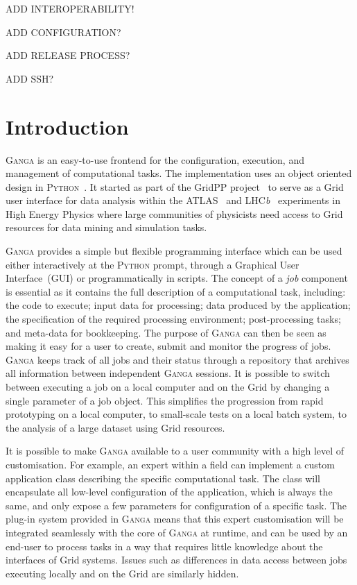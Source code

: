 \documentclass{elsart}
\def\lhcb {LHC{\em b\/}\xspace}
\def\atlas {ATLAS\xspace}
\def\ganga {\textsc{Ganga}\xspace}
\def\python {\textsc{Python}\xspace}
\def\grid {Grid\xspace}
\begin{document}
ADD INTEROPERABILITY!

ADD CONFIGURATION?

ADD RELEASE PROCESS?

ADD SSH?

\section{Introduction}
\label{sec:intro}
\ganga is an easy-to-use frontend for the configuration, execution, and
management of computational tasks. The implementation uses an object oriented
design in \python~\cite{python}. It started as part of the GridPP
project~\cite{Faulkner:2006px} to serve as a \grid user interface for data
analysis within the \atlas~\cite{ATLAS} and
\lhcb~\cite{LHCb} experiments in High Energy Physics where large
communities of physicists need access to \grid resources for data mining
and simulation tasks.

\ganga provides a simple but flexible programming interface which can
be used either interactively at the \python prompt, through a
Graphical User Interface~(GUI) or programmatically in scripts. The
concept of a \emph{job} component is essential as it contains the full
description of a computational task, including: the code to execute;
input data for processing; data produced by the application; the
specification of the required processing environment; post-processing
tasks; and meta-data for bookkeeping.  The purpose of \ganga can then
be seen as making it easy for a user to create, submit and monitor the
progress of jobs. \ganga keeps track of all jobs and their status
through a repository that archives all information between independent
\ganga sessions. It is possible to switch between executing a job on a
local computer and on the \grid by changing a single parameter of a job object. 
This simplifies the progression from rapid prototyping on a local
computer, to small-scale tests on a local batch system, to the analysis of a
large dataset using \grid resources.

It is possible to make \ganga available to a user community with a high level
of customisation. For example, an expert within a field can implement a custom
application class describing the specific computational task. The class will
encapsulate all low-level configuration of the application, which is always
the same, and only expose a few parameters for configuration of a specific
task. The plug-in system provided in \ganga means that this expert
customisation will be integrated seamlessly with the core of \ganga at runtime,
and can be used by an end-user to process tasks in a way that requires
little knowledge about the interfaces of \grid systems. Issues such as
differences in data access between jobs executing locally and on the
\grid are similarly hidden.
\end{document}
